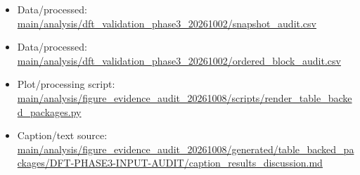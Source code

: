 \begin{itemize}[leftmargin=1.4em,noitemsep]
\item Data/processed: \begingroup\scriptsize\url{main/analysis/dft_validation_phase3_20261002/snapshot_audit.csv}\endgroup
\item Data/processed: \begingroup\scriptsize\url{main/analysis/dft_validation_phase3_20261002/ordered_block_audit.csv}\endgroup
\item Plot/processing script: \begingroup\scriptsize\url{main/analysis/figure_evidence_audit_20261008/scripts/render_table_backed_packages.py}\endgroup
\item Caption/text source: \begingroup\scriptsize\url{main/analysis/figure_evidence_audit_20261008/generated/table_backed_packages/DFT-PHASE3-INPUT-AUDIT/caption_results_discussion.md}\endgroup
\end{itemize}
